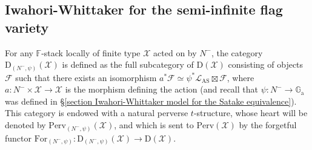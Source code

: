 \documentclass[11pt]{amsart}
\theoremstyle{plain}
\theoremstyle{remark}
\numberwithin{equation}{section}
\begin{document}
	\subsection{Iwahori-Whittaker for the semi-infinite flag variety}\label{section Iwahori-Whittaker for the semi-infinite flag variety}	For any $\mathbb{F}$-stack locally of finite type $\mathcal{X}$ acted on by $N^-$, the category $\mathrm{D}_{(N^-,\psi)}(\mathcal{X})$ is defined as the full subcategory of $\mathrm{D}(\mathcal{X})$ consisting of objects $\mathcal{F}$ such that there exists an isomorphism $a^*\mathcal{F}\simeq \psi^*\mathcal{L}_{\mathrm{AS}}\boxtimes \mathcal{F}$, where $a:N^-\times \mathcal{X}\to \mathcal{X}$ is the morphism defining the action (and recall that $\psi:N^-\to\mathbb{G}_\mathrm{a}$ was defined in §\ref{section Iwahori-Whittaker model for the Satake equivalence}). This category is endowed with a natural perverse $t$-structure, whose heart will be denoted by $\mathrm{Perv}_{(N^-,\psi)}(\mathcal{X})$, and which is sent to $\mathrm{Perv}(\mathcal{X})$ by the forgetful functor $\mathrm{For}_{(N^-,\psi)}:\mathrm{D}_{(N^-,\psi)}(\mathcal{X})\to \mathrm{D}(\mathcal{X})$.
	
\end{document}
